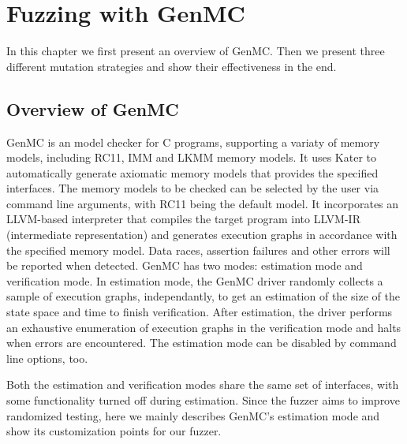 \chapter{\label{cha:genmc}Fuzzing with GenMC}

In this chapter we first present an overview of GenMC. Then we present three different mutation strategies and show their effectiveness in the end.

\section{Overview of GenMC}

GenMC is an model checker for C programs, supporting a variaty of memory models, including RC11\cite{RC11}, IMM\cite{IMM} and LKMM\cite{LKMM} memory models. It uses Kater\cite{Kater} to automatically generate axiomatic memory models that provides the specified interfaces. The memory models to be checked can be selected by the user via command line arguments, with RC11 being the default model. It incorporates an LLVM-based interpreter that compiles the target program into LLVM-IR (intermediate representation) and generates execution graphs in accordance with the specified memory model. Data races, assertion failures and other errors will be reported when detected. GenMC has two modes: estimation mode and verification mode. In estimation mode, the GenMC driver randomly collects a sample of execution graphs, independantly, to get an estimation of the size of the state space and time to finish verification. After estimation, the driver performs an exhaustive enumeration of execution graphs in the verification mode and halts when errors are encountered. The estimation mode can be disabled by command line options, too.

Both the estimation and verification modes share the same set of interfaces, with some functionality turned off during estimation. Since the fuzzer aims to improve randomized testing, here we mainly describes GenMC's estimation mode and show its customization points for our fuzzer.

